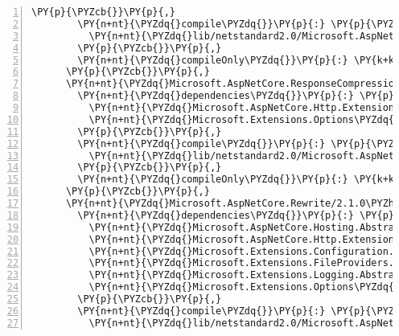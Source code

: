 \begin{Verbatim}[commandchars=\\\{\},numbers=left,firstnumber=1,stepnumber=1,numberblanklines=0]
        \PY{p}{\PYZcb{}}\PY{p}{,}
        \PY{n+nt}{\PYZdq{}compile\PYZdq{}}\PY{p}{:} \PY{p}{\PYZob{}}
          \PY{n+nt}{\PYZdq{}lib/netstandard2.0/Microsoft.AspNetCore.ResponseCaching.Abstractions.dll\PYZdq{}}\PY{p}{:} \PY{p}{\PYZob{}}\PY{p}{\PYZcb{}}
        \PY{p}{\PYZcb{}}\PY{p}{,}
        \PY{n+nt}{\PYZdq{}compileOnly\PYZdq{}}\PY{p}{:} \PY{k+kc}{true}
      \PY{p}{\PYZcb{}}\PY{p}{,}
      \PY{n+nt}{\PYZdq{}Microsoft.AspNetCore.ResponseCompression/2.1.0\PYZhy{}rc1\PYZhy{}final\PYZdq{}}\PY{p}{:} \PY{p}{\PYZob{}}
        \PY{n+nt}{\PYZdq{}dependencies\PYZdq{}}\PY{p}{:} \PY{p}{\PYZob{}}
          \PY{n+nt}{\PYZdq{}Microsoft.AspNetCore.Http.Extensions\PYZdq{}}\PY{p}{:} \PY{l+s+s2}{\PYZdq{}2.1.0\PYZhy{}rc1\PYZhy{}final\PYZdq{}}\PY{p}{,}
          \PY{n+nt}{\PYZdq{}Microsoft.Extensions.Options\PYZdq{}}\PY{p}{:} \PY{l+s+s2}{\PYZdq{}2.1.0\PYZhy{}rc1\PYZhy{}final\PYZdq{}}
        \PY{p}{\PYZcb{}}\PY{p}{,}
        \PY{n+nt}{\PYZdq{}compile\PYZdq{}}\PY{p}{:} \PY{p}{\PYZob{}}
          \PY{n+nt}{\PYZdq{}lib/netstandard2.0/Microsoft.AspNetCore.ResponseCompression.dll\PYZdq{}}\PY{p}{:} \PY{p}{\PYZob{}}\PY{p}{\PYZcb{}}
        \PY{p}{\PYZcb{}}\PY{p}{,}
        \PY{n+nt}{\PYZdq{}compileOnly\PYZdq{}}\PY{p}{:} \PY{k+kc}{true}
      \PY{p}{\PYZcb{}}\PY{p}{,}
      \PY{n+nt}{\PYZdq{}Microsoft.AspNetCore.Rewrite/2.1.0\PYZhy{}rc1\PYZhy{}final\PYZdq{}}\PY{p}{:} \PY{p}{\PYZob{}}
        \PY{n+nt}{\PYZdq{}dependencies\PYZdq{}}\PY{p}{:} \PY{p}{\PYZob{}}
          \PY{n+nt}{\PYZdq{}Microsoft.AspNetCore.Hosting.Abstractions\PYZdq{}}\PY{p}{:} \PY{l+s+s2}{\PYZdq{}2.1.0\PYZhy{}rc1\PYZhy{}final\PYZdq{}}\PY{p}{,}
          \PY{n+nt}{\PYZdq{}Microsoft.AspNetCore.Http.Extensions\PYZdq{}}\PY{p}{:} \PY{l+s+s2}{\PYZdq{}2.1.0\PYZhy{}rc1\PYZhy{}final\PYZdq{}}\PY{p}{,}
          \PY{n+nt}{\PYZdq{}Microsoft.Extensions.Configuration.Abstractions\PYZdq{}}\PY{p}{:} \PY{l+s+s2}{\PYZdq{}2.1.0\PYZhy{}rc1\PYZhy{}final\PYZdq{}}\PY{p}{,}
          \PY{n+nt}{\PYZdq{}Microsoft.Extensions.FileProviders.Abstractions\PYZdq{}}\PY{p}{:} \PY{l+s+s2}{\PYZdq{}2.1.0\PYZhy{}rc1\PYZhy{}final\PYZdq{}}\PY{p}{,}
          \PY{n+nt}{\PYZdq{}Microsoft.Extensions.Logging.Abstractions\PYZdq{}}\PY{p}{:} \PY{l+s+s2}{\PYZdq{}2.1.0\PYZhy{}rc1\PYZhy{}final\PYZdq{}}\PY{p}{,}
          \PY{n+nt}{\PYZdq{}Microsoft.Extensions.Options\PYZdq{}}\PY{p}{:} \PY{l+s+s2}{\PYZdq{}2.1.0\PYZhy{}rc1\PYZhy{}final\PYZdq{}}
        \PY{p}{\PYZcb{}}\PY{p}{,}
        \PY{n+nt}{\PYZdq{}compile\PYZdq{}}\PY{p}{:} \PY{p}{\PYZob{}}
          \PY{n+nt}{\PYZdq{}lib/netstandard2.0/Microsoft.AspNetCore.Rewrite.dll\PYZdq{}}\PY{p}{:} \PY{p}{\PYZob{}}\PY{p}{\PYZcb{}}

\end{Verbatim}
